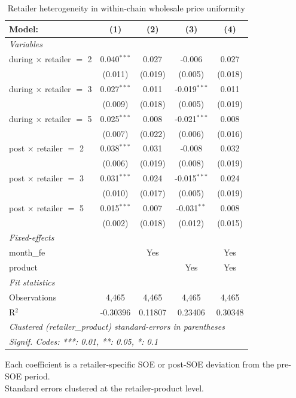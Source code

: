 
\begin{table}[htbp]
   \caption{\label{tab:uniformity_heterog_wholesale} Retailer heterogeneity in within-chain wholesale price uniformity}
   \centering
   \begin{tabular}{lcccc}
      \tabularnewline \midrule \midrule
      Model:                          & (1)           & (2)     & (3)            & (4)\\  
      \midrule
      \emph{Variables}\\
      during $\times$ retailer $=$ 2  & 0.040$^{***}$ & 0.027   & -0.006         & 0.027\\   
                                      & (0.011)       & (0.019) & (0.005)        & (0.018)\\   
      during $\times$ retailer $=$ 3  & 0.027$^{***}$ & 0.011   & -0.019$^{***}$ & 0.011\\   
                                      & (0.009)       & (0.018) & (0.005)        & (0.019)\\   
      during $\times$ retailer $=$ 5  & 0.025$^{***}$ & 0.008   & -0.021$^{***}$ & 0.008\\   
                                      & (0.007)       & (0.022) & (0.006)        & (0.016)\\   
      post $\times$ retailer $=$ 2    & 0.038$^{***}$ & 0.031   & -0.008         & 0.032\\   
                                      & (0.006)       & (0.019) & (0.008)        & (0.019)\\   
      post $\times$ retailer $=$ 3    & 0.031$^{***}$ & 0.024   & -0.015$^{***}$ & 0.024\\   
                                      & (0.010)       & (0.017) & (0.005)        & (0.019)\\   
      post $\times$ retailer $=$ 5    & 0.015$^{***}$ & 0.007   & -0.031$^{**}$  & 0.008\\   
                                      & (0.002)       & (0.018) & (0.012)        & (0.015)\\   
      \midrule
      \emph{Fixed-effects}\\
      month\_fe                       &               & Yes     &                & Yes\\  
      product                         &               &         & Yes            & Yes\\  
      \midrule
      \emph{Fit statistics}\\
      Observations                    & 4,465         & 4,465   & 4,465          & 4,465\\  
      R$^2$                           & -0.30396      & 0.11807 & 0.23406        & 0.30348\\  
      \midrule \midrule
      \multicolumn{5}{l}{\emph{Clustered (retailer\_product) standard-errors in parentheses}}\\
      \multicolumn{5}{l}{\emph{Signif. Codes: ***: 0.01, **: 0.05, *: 0.1}}\\
   \end{tabular}
   
   \par \raggedright 
   Each coefficient is a retailer-specific SOE or post-SOE deviation from the pre-SOE period.\\
   Standard errors clustered at the retailer-product level.
\end{table}


